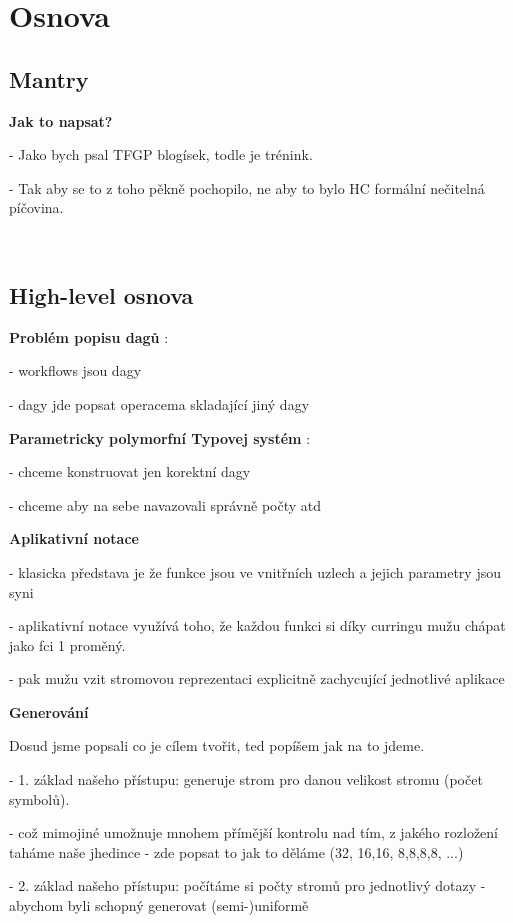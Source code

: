 \documentclass[a4paper,oneside]{memoir}
\begin{document}
\section{Osnova}

\subsection{Mantry}

\textbf{Jak to napsat?}

- Jako bych psal TFGP blogísek, todle je trénink.

- Tak aby se to z toho pěkně pochopilo, ne aby to bylo HC formální nečitelná píčovina.

~\\

\subsection{High-level osnova}

\textbf{Problém popisu dagů} : 

- workflows jsou dagy

- dagy jde popsat operacema skladající jiný dagy

\textbf{Parametricky polymorfní Typovej systém} : 

- chceme konstruovat jen korektní dagy

- chceme aby na sebe navazovali správně počty atd

\textbf{Aplikativní notace}

- klasicka představa je že funkce jsou ve vnitřních uzlech a jejich parametry jsou syni

- aplikativní notace využívá toho, že každou funkci si díky curringu mužu chápat jako fci 1 proměný. 

- pak mužu vzit stromovou reprezentaci explicitně zachycující jednotlivé aplikace

\textbf{Generování}

Dosud jsme popsali co je cílem tvořit, ted popíšem jak na to jdeme.

- 1. základ našeho přístupu: generuje strom pro danou velikost stromu (počet symbolů).
  
  - což mimojiné umožnuje mnohem přímější kontrolu nad tím, z jakého rozložení taháme naše jhedince 
  - zde popsat to jak to děláme (32, 16,16, 8,8,8,8, ...)

- 2. základ našeho přístupu: počítáme si počty stromů pro jednotlivý dotazy 
     - abychom byli schopný generovat (semi-)uniformě
\end{document}
